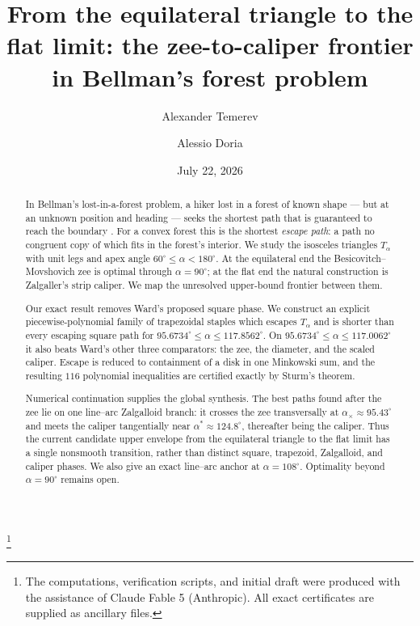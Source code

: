 \documentclass[11pt]{amsart}
\theoremstyle{remark}
\begin{document}
\title[The zee-to-caliper frontier]{From the equilateral triangle to the flat
limit: the zee-to-caliper frontier in Bellman's forest problem}

\author{Alexander Temerev}
\address{University of Geneva, Geneva, Switzerland}

\author{Alessio Doria}
\thanks{The computations, verification scripts, and initial draft were
produced with the assistance of Claude Fable 5 (Anthropic).  All exact
certificates are supplied as ancillary files.}

\date{July 22, 2026}

\begin{abstract}
In Bellman's lost-in-a-forest problem, a hiker lost in a forest of known
shape --- but at an unknown position and heading --- seeks the shortest path
that is guaranteed to reach the boundary \cite{bellman1956,finchwetzel2004}.
For a convex forest this is the shortest \emph{escape path}: a path no
congruent copy of which fits in the forest's interior.  We study the
isosceles triangles $T_\alpha$ with unit legs and apex angle
$60^\circ\le\alpha<180^\circ$.  At the equilateral end the
Besicovitch--Movshovich zee is optimal through $\alpha=90^\circ$; at the flat
end the natural construction is Zalgaller's strip caliper.  We map the
unresolved upper-bound frontier between them.

Our exact result removes Ward's proposed square phase.  We construct an
explicit piecewise-polynomial family of trapezoidal staples which escapes
$T_\alpha$ and is shorter than every escaping square path for
$95.6734^\circ\le\alpha\le117.8562^\circ$.  On
$95.6734^\circ\le\alpha\le117.0062^\circ$ it also beats Ward's other three
comparators: the zee, the diameter, and the scaled caliper.  Escape is reduced
to containment of a disk in one Minkowski sum, and the resulting $116$
polynomial inequalities are certified exactly by Sturm's theorem.

Numerical continuation supplies the global synthesis.  The best paths found
after the zee lie on one line--arc Zalgalloid branch: it crosses the zee
transversally at $\alpha_\times\approx95.43^\circ$ and meets the caliper
tangentially near $\alpha^*\approx124.8^\circ$, thereafter being the caliper.
Thus the current candidate upper envelope from the equilateral triangle to the
flat limit has a single nonsmooth transition, rather than distinct square,
trapezoid, Zalgalloid, and caliper phases.  We also give an exact line--arc
anchor at $\alpha=108^\circ$.  Optimality beyond $\alpha=90^\circ$ remains
open.
\end{abstract}
\end{document}
